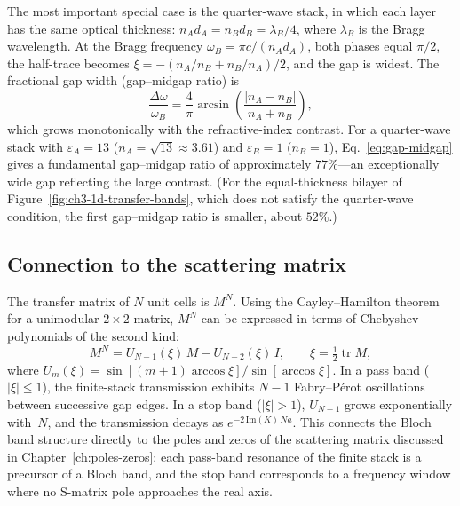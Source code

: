 \begin{example}
\label{ex:quarter-wave}
The most important special case is the quarter-wave stack, in which each
layer has the same optical thickness:
$n_A d_A = n_B d_B = \lambda_B/4$, where $\lambda_B$ is the Bragg
wavelength. At the Bragg frequency $\omega_B = \pi c/(n_A d_A)$, both
phases equal $\pi/2$, the half-trace becomes
$\xi = -(n_A/n_B + n_B/n_A)/2$,
and the gap is widest. The fractional gap width (gap--midgap ratio) is
\begin{equation}
 \frac{\Delta\omega}{\omega_B}
 = \frac{4}{\pi}\arcsin\!\left(\frac{|n_A - n_B|}{n_A + n_B}\right),
 \label{eq:gap-midgap}
\end{equation}
which grows monotonically with the refractive-index contrast. For
a quarter-wave stack with $\varepsilon_A = 13$ ($n_A = \sqrt{13} \approx 3.61$)
and $\varepsilon_B = 1$ ($n_B = 1$),
Eq.~\eqref{eq:gap-midgap} gives a fundamental gap--midgap ratio of
approximately $77\%$---an exceptionally wide gap reflecting the large
contrast. (For the equal-thickness bilayer of
Figure~\ref{fig:ch3-1d-transfer-bands}, which does not satisfy the
quarter-wave condition, the first gap--midgap ratio is smaller, about $52\%$.)
\end{example}

\subsection{Connection to the scattering matrix}
\label{ssec:1d-smatrix}

The transfer matrix of $N$ unit cells is $M^N$. Using the Cayley--Hamilton
theorem for a unimodular $2\times 2$ matrix, $M^N$ can be expressed in
terms of Chebyshev polynomials of the second kind:
\begin{equation}
 M^N = U_{N-1}(\xi)\,M - U_{N-2}(\xi)\,I,
 \qquad \xi = \tfrac{1}{2}\operatorname{tr}M,
 \label{eq:chebyshev-transfer}
\end{equation}
where $U_m(\xi) = \sin[(m+1)\arccos\xi]/\sin[\arccos\xi]$. In a pass
band ($|\xi| \le 1$), the finite-stack transmission exhibits $N - 1$
Fabry--P\'erot oscillations between successive gap edges. In a stop band
($|\xi| > 1$), $U_{N-1}$ grows exponentially with~$N$, and the
transmission decays as $e^{-2\,\mathrm{Im}(K)\,Na}$. This connects the
Bloch band structure directly to the poles and zeros of the scattering
matrix discussed in Chapter~\ref{ch:poles-zeros}: each pass-band
resonance of the finite stack is a precursor of a Bloch band, and the
stop band corresponds to a frequency window where no S-matrix pole
approaches the real axis.

